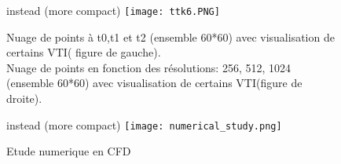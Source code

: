 \begin{figure}[H]
 \centering %
instead (more compact)
 \texttt{[image: ttk6.PNG]}
 \caption{Nuage de points à t0,t1 et t2 (ensemble 60*60) avec visualisation de
certains VTI( figure de gauche).\\
 Nuage de points en fonction des résolutions: 256, 512, 1024 (ensemble 60*60)
avec visualisation de certains VTI(figure de droite).}
 \label{fig:sample}
\end{figure}

\begin{figure}[H]
 \centering %
instead (more compact)
 \texttt{[image: numerical\_study.png]}
 \caption{Etude numerique en CFD}
 \label{fig:sample}
\end{figure}


